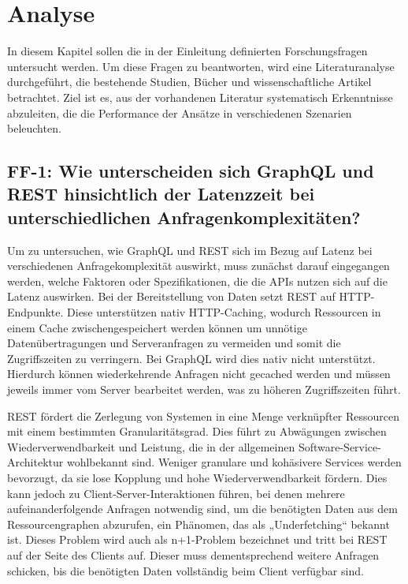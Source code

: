 \chapter{Analyse} %
\label{sec:analyse}
In diesem Kapitel sollen die in der Einleitung definierten Forschungsfragen untersucht werden. Um diese Fragen zu beantworten, wird eine Literaturanalyse durchgeführt, die bestehende Studien, Bücher und wissenschaftliche Artikel betrachtet. Ziel ist es, aus der vorhandenen Literatur systematisch Erkenntnisse abzuleiten, die die Performance der Ansätze in verschiedenen Szenarien beleuchten.

\section{FF-1: Wie unterscheiden sich GraphQL und REST hinsichtlich der Latenzzeit bei unterschiedlichen Anfragenkomplexitäten?} %
\label{sec:ff1}
Um zu untersuchen, wie GraphQL und REST sich im Bezug auf Latenz bei verschiedenen Anfragekomplexität auswirkt, muss zunächst darauf eingegangen werden, welche Faktoren oder Spezifikationen, die die APIs nutzen sich auf die Latenz auswirken.
Bei der Bereitstellung von Daten setzt REST auf HTTP-Endpunkte. Diese unterstützen nativ HTTP-Caching,  wodurch Ressourcen in einem Cache zwischengespeichert werden können um unnötige Datenübertragungen und Serveranfragen zu vermeiden und somit die Zugriffszeiten zu verringern.
Bei GraphQL wird dies nativ nicht unterstützt. Hierdurch können wiederkehrende Anfragen nicht gecached werden und müssen jeweils immer vom Server bearbeitet werden, was zu höheren Zugriffszeiten führt. \citep{graphqlreplacerest}

\noindent
REST fördert die Zerlegung von Systemen in eine Menge verknüpfter Ressourcen mit einem bestimmten Granularitätsgrad. Dies führt zu Abwägungen zwischen Wiederverwendbarkeit und Leistung, die in der allgemeinen Software-Service-Architektur wohlbekannt sind. Weniger granulare und kohäsivere Services werden bevorzugt, da sie lose Kopplung und hohe Wiederverwendbarkeit fördern. Dies kann jedoch zu Client-Server-Interaktionen führen, bei denen mehrere aufeinanderfolgende Anfragen notwendig sind, um die benötigten Daten aus dem Ressourcengraphen abzurufen, ein Phänomen, das als „Underfetching“ bekannt ist. Dieses Problem wird auch als n+1-Problem bezeichnet und tritt bei REST auf der Seite des Clients auf. Dieser muss dementsprechend weitere Anfragen schicken, bis die benötigten Daten vollständig beim Client verfügbar sind. \citep{graphqlhealth} \citep{migrategraphql}

